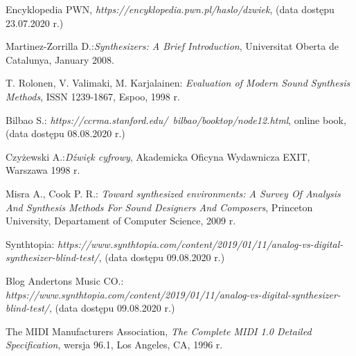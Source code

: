 \documentclass[nostrict]{szablonPG}
\begin{document}



	\setcounter{page}{3}
	\let\cleardoublepage\clearpage
	
	
	\tableofcontents    %
	
%	
	
	
	
	
	
	
	
	
%	
	
	

	\listoffigures      %
	\listoftables

	\begin{thebibliography}{20}                      %
		\small              %
		Encyklopedia PWN, \emph{https://encyklopedia.pwn.pl/haslo/dzwiek}, (data dostępu 23.07.2020 r.)
		
		Martinez-Zorrilla D.:\emph{Synthesizers: A Brief Introduction}, Universitat Oberta de Catalunya, January 2008.

		T. Rolonen, V. Valimaki, M. Karjalainen: \emph{Evaluation of Modern Sound Synthesis Methods}, ISSN 1239-1867, Espoo, 1998 r.

		Bilbao S.: \emph{https://ccrma.stanford.edu/~bilbao/booktop/node12.html}, online book, (data dostępu 08.08.2020 r.)
		
		 Czyżewski A.:\emph{Dźwięk cyfrowy}, Akademicka Oficyna Wydawnicza EXIT, Warszawa 1998 r.
		 
		 Misra A., Cook P. R.: \emph{Toward synthesized environments: A Survey Of Analysis And Synthesis Methods For Sound Designers And Composers}, Princeton University, Departament of Computer Science, 2009 r.
		
		Synthtopia: \emph{https://www.synthtopia.com/content/2019/01/11/analog-vs-digital-synthesizer-blind-test/}, (data dostępu 09.08.2020 r.)

		Blog Andertons Music CO.: \emph{https://www.synthtopia.com/content/2019/01/11/analog-vs-digital-synthesizer-blind-test/}, (data dostępu 09.08.2020 r.)
	
		The MIDI Manufacturers Association, \emph{The Complete MIDI 1.0 Detailed Specification}, wersja 96.1, Los Angeles, CA, 1996 r.
		

\end{thebibliography}
\end{document}
